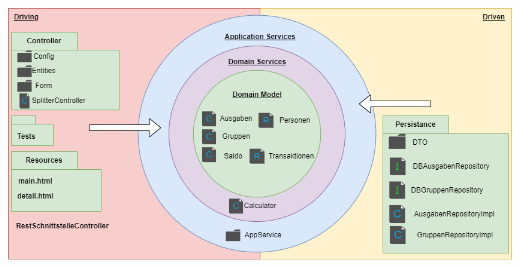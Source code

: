 \documentclass[
]{article}
\begin{document}
\includegraphics[width=150mm, height=100mm]{StrukturFertig}
\end{document}
